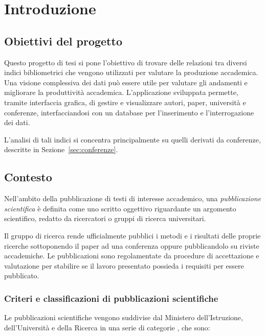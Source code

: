 \chapter{Introduzione}

\section{Obiettivi del progetto}

Questo progetto di tesi si pone l’obiettivo di trovare delle relazioni tra
diversi indici bibliometrici che vengono utilizzati  per valutare la produzione
accademica. Una visione complessiva dei dati può essere utile per valutare gli
andamenti e migliorare la produttività accademica. L’applicazione sviluppata
permette, tramite interfaccia grafica, di gestire e visualizzare autori, paper,
università e conferenze, interfacciandosi con un database per l’inserimento e
l’interrogazione dei dati.

L'analisi di tali indici si concentra principalmente su quelli derivati da conferenze,
descritte in Sezione~\ref{sec:conferenze}.


\section{Contesto}


Nell’ambito della pubblicazione di testi di interesse accademico, una
\textit{pubblicazione scientifica} è definita come uno scritto oggettivo
riguardante un argomento scientifico, redatto da ricercatori o gruppi di ricerca
universitari.

Il gruppo di ricerca rende ufficialmente pubblici i metodi e i risultati delle
proprie ricerche sottoponendo il paper ad una conferenza oppure pubblicandolo
su riviste accademiche. Le pubblicazioni sono regolamentate da procedure di
accettazione e valutazione per stabilire se il lavoro presentato possieda i
requisiti per essere pubblicato.

\subsection{Criteri e classificazioni di pubblicazioni scientifiche}

Le pubblicazioni scientifiche vengono suddivise dal Ministero dell'Istruzione,
dell'Università e della Ricerca in una serie di categorie
\cite{criteri2009pubblicazioni}, che sono:

